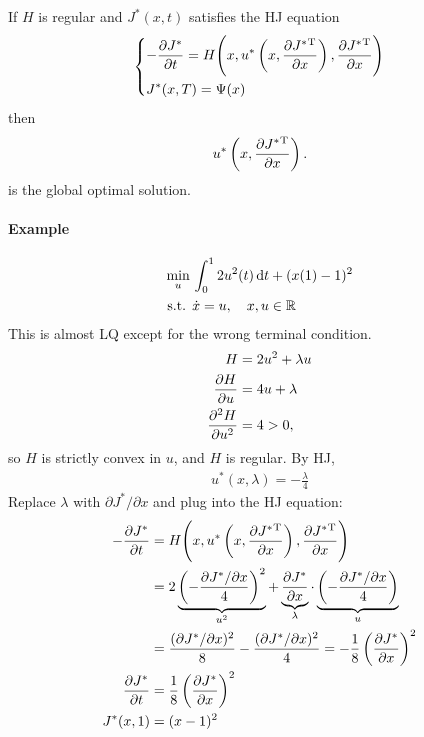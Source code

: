\begin{thm}
  If $H$ is regular and $J^*(x,t)$ satisfies the HJ equation
  \begin{gather}
    \begin{dcases}
      -\frac{\partial J^*}{\partial t} = H\Bigg( x, u^*\left(x,\frac{\partial J^*{}^\text{T}}{\partial x}\right), \frac{\partial J^*{}^\text{T}}{\partial x} \Bigg) \\
      J^*(x,T) = \Psi(x)
    \end{dcases}
  \end{gather}
  then
  \begin{gather}
    u^*\left(x,\frac{\partial J^*{}^\text{T}}{\partial x}\right).
  \end{gather}
  is the global optimal solution.
\end{thm}

\paragraph{Example} \mbox{}
\begin{align}
  \min_u {} & \int_0^1 2u^2(t)\mathop{}\!\mathrm{d} t + (x(1)-1)^2 \\
  \text{s.t. } & \dot x = u,\quad x,u\in\mathbb{R}
\end{align}
This is almost LQ except for the wrong terminal condition.
\begin{align}
  H &= 2u^2 + \lambda u \\
  \frac{\partial H}{\partial u} &= 4u + \lambda \\
  \frac{\partial ^2 H}{\partial u^2} &= 4 > 0,
\end{align}
so $H$ is strictly convex in $u$, and $H$ is regular. By HJ,
\begin{align}
  u^*(x,\lambda) = -\frac{\lambda}{4}
\end{align}
Replace $\lambda$ with $\partial J^*/\partial x$ and plug into the HJ equation:
\begin{align}
  -\frac{\partial J^*}{\partial t} &= H\Bigg( x, u^*\left(x,\frac{\partial J^*{}^\text{T}}{\partial x}\right), \frac{\partial J^*{}^\text{T}}{\partial x} \Bigg) \\
                 &= 2 \underbrace{\left( -\frac{\partial J^*/\partial x}{4} \right)^2}_{u^2} + \underbrace{\frac{\partial J^*}{\partial x}}_{\lambda} \cdot \underbrace{\left( -\frac{\partial J^*/\partial x}{4} \right)}_{u} \\
                 &= \frac{(\partial J^*/\partial x)^2}{8} - \frac{(\partial J^*/\partial x)^2}{4} = -\frac{1}{8} \left(\frac{\partial J^*}{\partial x}\right)^2 \\
  \frac{\partial J^*}{\partial t} &= \frac{1}{8} \left(\frac{\partial J^*}{\partial x}\right)^2 \\
  J^*(x,1) &= (x-1)^2
\end{align}
